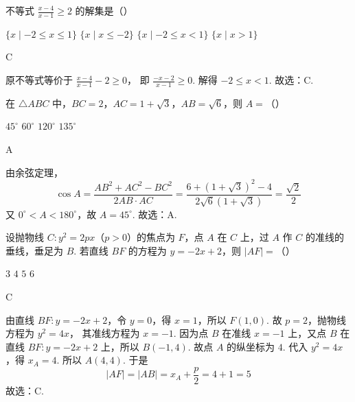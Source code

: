 \begin{problem}
不等式 \(\frac{x-4}{x-1}\ge 2\) 的解集是（\quad）

\choices
    {\(\{x \mid -2\le x\le 1\}\)}
    {\(\{x \mid x\le -2\}\)}
    {\(\{x \mid -2\le x<1\}\)}
    {\(\{x \mid x>1\}\)}
\end{problem}

\begin{answer}
C
\end{answer}

\begin{solution}
原不等式等价于
\(\frac{x-4}{x-1}-2\ge 0\)，
即
\(\frac{-x-2}{x-1}\ge 0\).
解得 \(-2\le x<1\). 故选：C.
\end{solution}

\begin{problem}
在 \(\triangle ABC\) 中，\(BC=2\)，\(AC=1+\sqrt3\)，\(AB=\sqrt6\)，则 \(A=\)（\quad）

\choices
    {\(45^\circ\)}
    {\(60^\circ\)}
    {\(120^\circ\)}
    {\(135^\circ\)}
\end{problem}

\begin{answer}
A
\end{answer}

\begin{solution}
由余弦定理，
\[
\cos A=\frac{AB^2+AC^2-BC^2}{2AB\cdot AC}
=\frac{6+\left(1+\sqrt3\right)^2-4}{2\sqrt6\left(1+\sqrt3\right)}
=\frac{\sqrt2}{2}
\]
又 \(0^\circ<A<180^\circ\)，故 \(A=45^\circ\). 故选：A.
\end{solution}

\begin{problem}
设抛物线 \(C:y^2=2px\)（\(p>0\)）的焦点为 \(F\)，点 \(A\) 在 \(C\) 上，过 \(A\) 作 \(C\) 的准线的垂线，垂足为 \(B\). 若直线 \(BF\) 的方程为 \(y=-2x+2\)，则 \(|AF|=\)（\quad）

\choices
    {\(3\)}
    {\(4\)}
    {\(5\)}
    {\(6\)}
\end{problem}

\begin{answer}
C
\end{answer}

\begin{solution}
由直线 \(BF:y=-2x+2\)，令 \(y=0\)，得 \(x=1\)，所以 \(F(1,0)\). 故 \(p=2\)，抛物线方程为
\(y^2=4x\)，
其准线方程为 \(x=-1\).
因为点 \(B\) 在准线 \(x=-1\) 上，又点 \(B\) 在直线 \(BF:y=-2x+2\) 上，所以
\(B(-1,4)\).
故点 \(A\) 的纵坐标为 \(4\). 代入 \(y^2=4x\)，得
\(x_A=4\).
所以 \(A(4,4)\).
于是
\[
\lvert AF\rvert=\lvert AB\rvert=x_A+\frac p2=4+1=5
\]
故选：C.
\end{solution}

